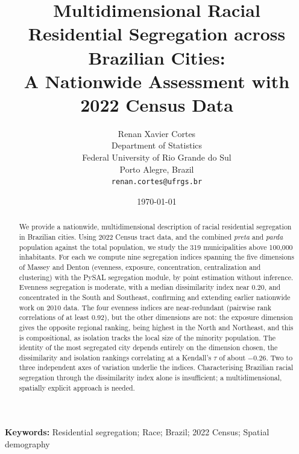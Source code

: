\documentclass[12pt,a4paper]{article}
\title{Multidimensional Racial Residential Segregation across Brazilian Cities:\\
A Nationwide Assessment with 2022 Census Data}
\author{}
\date{}
\author{
  Renan Xavier Cortes\\
  Department of Statistics\\
  Federal University of Rio Grande do Sul\\
  Porto Alegre, Brazil\\
  \texttt{renan.cortes@ufrgs.br}
  }
\date{\today}
\begin{document}
\maketitle


\begin{abstract}
We provide a nationwide, multidimensional description of racial residential segregation in Brazilian cities. Using 2022 Census tract data, and the combined \emph{preta} and \emph{parda} population against the total population, we study the 319 municipalities above 100{,}000 inhabitants. For each we compute nine segregation indices spanning the five dimensions of Massey and Denton (evenness, exposure, concentration, centralization and clustering) with the PySAL segregation module, by point estimation without inference. Evenness segregation is moderate, with a median dissimilarity index near 0.20, and concentrated in the South and Southeast, confirming and extending earlier nationwide work on 2010 data. The four evenness indices are near-redundant (pairwise rank correlations of at least 0.92), but the other dimensions are not: the exposure dimension gives the opposite regional ranking, being highest in the North and Northeast, and this is compositional, as isolation tracks the local size of the minority population. The identity of the most segregated city depends entirely on the dimension chosen, the dissimilarity and isolation rankings correlating at a Kendall's $\tau$ of about $-0.26$. Two to three independent axes of variation underlie the indices. Characterising Brazilian racial segregation through the dissimilarity index alone is insufficient; a multidimensional, spatially explicit approach is needed.
\end{abstract}

\noindent\textbf{Keywords:} Residential segregation; Race; Brazil; 2022 Census; Spatial demography

\end{document}
